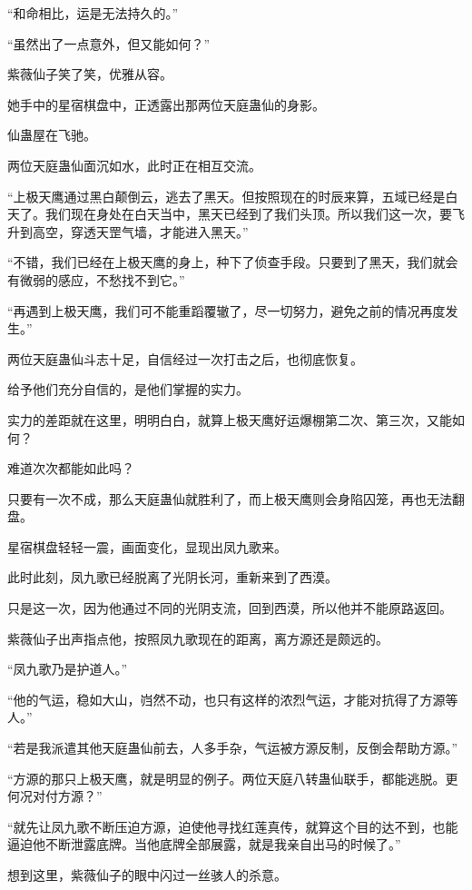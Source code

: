 
\begin{this_body}

“和命相比，运是无法持久的。”

“虽然出了一点意外，但又能如何？”

紫薇仙子笑了笑，优雅从容。

她手中的星宿棋盘中，正透露出那两位天庭蛊仙的身影。

仙蛊屋在飞驰。

两位天庭蛊仙面沉如水，此时正在相互交流。

“上极天鹰通过黑白颠倒云，逃去了黑天。但按照现在的时辰来算，五域已经是白天了。我们现在身处在白天当中，黑天已经到了我们头顶。所以我们这一次，要飞升到高空，穿透天罡气墙，才能进入黑天。”

“不错，我们已经在上极天鹰的身上，种下了侦查手段。只要到了黑天，我们就会有微弱的感应，不愁找不到它。”

“再遇到上极天鹰，我们可不能重蹈覆辙了，尽一切努力，避免之前的情况再度发生。”

两位天庭蛊仙斗志十足，自信经过一次打击之后，也彻底恢复。

给予他们充分自信的，是他们掌握的实力。

实力的差距就在这里，明明白白，就算上极天鹰好运爆棚第二次、第三次，又能如何？

难道次次都能如此吗？

只要有一次不成，那么天庭蛊仙就胜利了，而上极天鹰则会身陷囚笼，再也无法翻盘。

星宿棋盘轻轻一震，画面变化，显现出凤九歌来。

此时此刻，凤九歌已经脱离了光阴长河，重新来到了西漠。

只是这一次，因为他通过不同的光阴支流，回到西漠，所以他并不能原路返回。

紫薇仙子出声指点他，按照凤九歌现在的距离，离方源还是颇远的。

“凤九歌乃是护道人。”

“他的气运，稳如大山，岿然不动，也只有这样的浓烈气运，才能对抗得了方源等人。”

“若是我派遣其他天庭蛊仙前去，人多手杂，气运被方源反制，反倒会帮助方源。”

“方源的那只上极天鹰，就是明显的例子。两位天庭八转蛊仙联手，都能逃脱。更何况对付方源？”

“就先让凤九歌不断压迫方源，迫使他寻找红莲真传，就算这个目的达不到，也能逼迫他不断泄露底牌。当他底牌全部展露，就是我亲自出马的时候了。”

想到这里，紫薇仙子的眼中闪过一丝骇人的杀意。


\end{this_body}
